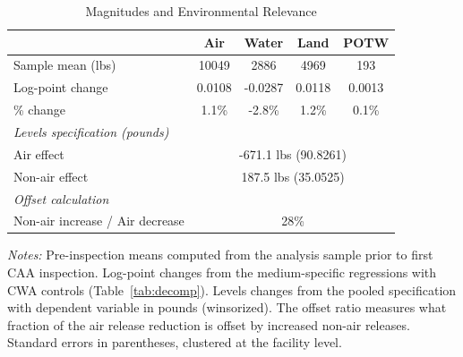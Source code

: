 \begin{table}[htbp]
\centering
\caption{Magnitudes and Environmental Relevance}
\label{tab:magnitudes}
\begin{tabular}{lcccc}
\toprule
& Air & Water & Land & POTW \\
\midrule
Sample mean (lbs) & 10049 & 2886 & 4969 & 193 \\[3pt]
Log-point change & 0.0108 & -0.0287 & 0.0118 & 0.0013 \\
\% change & 1.1\% & -2.8\% & 1.2\% & 0.1\% \\[6pt]
\midrule
\multicolumn{5}{l}{\textit{Levels specification (pounds)}} \\[3pt]
Air effect & \multicolumn{4}{c}{-671.1 lbs (90.8261)} \\
Non-air effect & \multicolumn{4}{c}{187.5 lbs (35.0525)} \\[3pt]
\midrule
\multicolumn{5}{l}{\textit{Offset calculation}} \\[3pt]
Non-air increase / Air decrease & \multicolumn{4}{c}{28\%} \\
\bottomrule
\end{tabular}
\begin{minipage}{0.95\textwidth}
\vspace{0.3em}
\footnotesize \textit{Notes:} Pre-inspection means computed from the analysis sample prior to first CAA inspection. Log-point changes from the medium-specific regressions with CWA controls (Table~\ref{tab:decomp}). Levels changes from the pooled specification with dependent variable in pounds (winsorized). The offset ratio measures what fraction of the air release reduction is offset by increased non-air releases. Standard errors in parentheses, clustered at the facility level.
\end{minipage}
\end{table}
